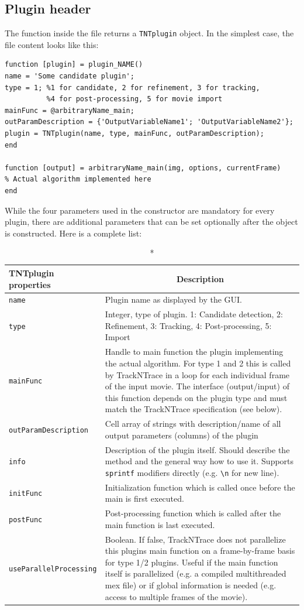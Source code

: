 \documentclass[11pt,onside]{report}
\numberwithin{equation}{chapter}
\begin{document}
\subsection{Plugin header}
The function inside the file returns a \texttt{TNTplugin} object. In the simplest case, the file content looks like this:
\begin{lstlisting}[style=Matlab-editor]
function [plugin] = plugin_NAME()
name = 'Some candidate plugin';
type = 1; %1 for candidate, 2 for refinement, 3 for tracking, 
          %4 for post-processing, 5 for movie import
mainFunc = @arbitraryName_main;
outParamDescription = {'OutputVariableName1'; 'OutputVariableName2'};
plugin = TNTplugin(name, type, mainFunc, outParamDescription);
end

function [output] = arbitraryName_main(img, options, currentFrame) 
% Actual algorithm implemented here
end
\end{lstlisting}
While the four parameters used in the constructor are mandatory for every plugin, there are additional parameters that can be set optionally after the object is constructed. Here is a complete list:

\begin{longtable}[!h]{p{} p{}}
\caption*{\textbf{TNTplugin properties}}
\endfirsthead
\endhead
\toprule
\multicolumn{1}{c}{Property} & \multicolumn{1}{c}{Description}\\ \midrule
  \texttt{name} & Plugin name as displayed by the GUI. \\
  \texttt{type} & Integer, type of plugin. 1: Candidate detection, 2: Refinement, 3: Tracking, 4: Post-processing, 5: Import \\
  \texttt{mainFunc} & Handle to main function the plugin implementing the actual algorithm. For type 1 and 2 this is called by TrackNTrace in a loop for each individual frame of the input movie. The interface (output/input) of this function depends on the plugin type and must match the TrackNTrace specification (see below). \\
  \texttt{outParamDescription} &  Cell array of strings with description/name of all output parameters (columns) of the plugin \\
 \texttt{info} & Description of the plugin itself. Should describe the method and the general way how to use it. Supports \texttt{sprintf} modifiers directly (e.g. \texttt{\textbackslash n} for new line). \\
  \texttt{initFunc} &  Initialization function which is called once before the main is first executed. \\
  \texttt{postFunc} & Post-processing function which is called after the main function is last executed. \\
  \texttt{useParallelProcessing}&  Boolean. If false, TrackNTrace does not parallelize this plugins main function on a frame-by-frame basis for type 1/2 plugins. Useful if the main function itself is parallelized (e.g. a compiled multithreaded mex file) or if global information is needed (e.g. access to multiple frames of the movie).\\
  \bottomrule
\end{longtable}
\FloatBarrier
\end{document}
